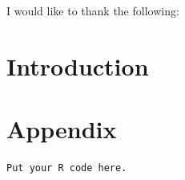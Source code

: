\documentclass[a4paper,12pt]{article}
\begin{document}
I would like to thank the following:
\clearpage

\tableofcontents
\listoffigures
\listoftables
\clearpage

\section{Introduction}

\clearpage

\section*{Appendix}
\begin{verbatim}
Put your R code here.
\end{verbatim}
\end{document}
